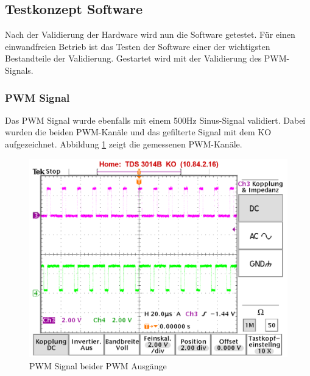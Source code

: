 \subsection{Testkonzept Software}\label{sec:testkonzeptSoftware}
Nach der Validierung der Hardware wird nun die Software getestet. Für einen einwandfreien Betrieb ist das Testen der Software einer der wichtigsten Bestandteile der Validierung. Gestartet wird mit der Validierung des PWM-Signals.

\subsubsection{PWM Signal}\label{sec: Validierung PWM Signal}

Das PWM Signal wurde ebenfalls mit einem 500Hz Sinus-Signal validiert. Dabei wurden die beiden PWM-Kanäle und das gefilterte Signal mit dem KO aufgezeichnet. Abbildung \ref{fig:Signal PWM Ausgänge} zeigt die gemessenen PWM-Kanäle.

\begin{figure}[H]
	\begin{center}
		\includegraphics[width=120mm]{data/PWM_Signal_500Hz_Mono_mit_Infos.png}
		\caption[PWM Signal beider PWM Ausgänge]{PWM Signal beider PWM Ausgänge} %
		\label{fig:Signal PWM Ausgänge}
	\end{center}
\end{figure}



